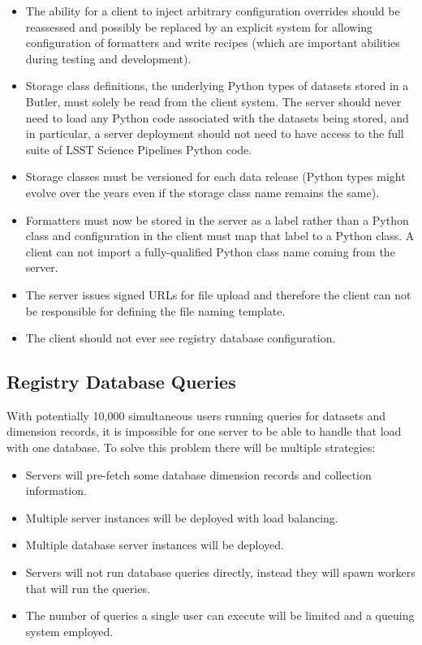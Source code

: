 \begin{itemize}
\item The ability for a client to inject arbitrary configuration overrides should be reassessed and possibly be replaced by an explicit system for allowing configuration of formatters and write recipes (which are important abilities during testing and development).
\item Storage class definitions, the underlying Python types of datasets stored in a Butler, must solely be read from the client system.
  The server should never need to load any Python code associated with the datasets being stored, and in particular, a server deployment should not need to have access to the full suite of LSST Science Pipelines Python code.
\item Storage classes must be versioned for each data release (Python types might evolve over the years even if the storage class name remains the same).
\item Formatters must now be stored in the server as a label rather than a Python class and configuration in the client must map that label to a Python class.
  A client can not import a fully-qualified Python class name coming from the server.
\item The server issues signed URLs for file upload and therefore the client can not be responsible for defining the file naming template.
\item The client should not ever see registry database configuration.
\end{itemize}

\subsection{Registry Database Queries}

With potentially 10,000 simultaneous users running queries for datasets and dimension records, it is impossible for one server to be able to handle that load with one database.
To solve this problem there will be multiple strategies:

\begin{itemize}
\item
  Servers will pre-fetch some database dimension records and collection information. \cite{DMTN-289}
\item
  Multiple server instances will be deployed with load balancing.
\item
  Multiple database server instances will be deployed.
\item
  Servers will not run database queries directly, instead they will spawn workers that will run the queries.
\item
  The number of queries a single user can execute will be limited and a queuing system employed.
\end{itemize}


